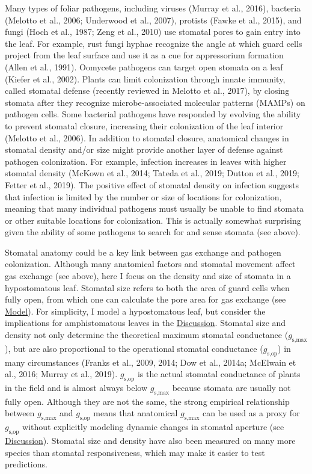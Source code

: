 \documentclass[utf8]{frontiersSCNS}
\newcommand{\gsmax}{$g_\text{s,max}$}
\newcommand{\gsop}{$g_\text{s,op}$}
\begin{document}
Many types of foliar pathogens, including viruses (Murray et al., 2016),
bacteria (Melotto et al., 2006; Underwood et al., 2007), protists (Fawke
et al., 2015), and fungi (Hoch et al., 1987; Zeng et al., 2010) use
stomatal pores to gain entry into the leaf. For example, rust fungi
hyphae recognize the angle at which guard cells project from the leaf
surface and use it as a cue for appressorium formation (Allen et al.,
1991). Oomycete pathogens can target open stomata on a leaf (Kiefer et
al., 2002). Plants can limit colonization through innate immunity,
called stomatal defense (recently reviewed in Melotto et al., 2017), by
closing stomata after they recognize microbe-associated molecular
patterns (MAMPs) on pathogen cells. Some bacterial pathogens have
responded by evolving the ability to prevent stomatal closure,
increasing their colonization of the leaf interior (Melotto et al.,
2006). In addition to stomatal closure, anatomical changes in stomatal
density and/or size might provide another layer of defense against
pathogen colonization. For example, infection increases in leaves with
higher stomatal density (McKown et al., 2014; Tateda et al., 2019;
Dutton et al., 2019; Fetter et al., 2019). The positive effect of
stomatal density on infection suggests that infection is limited by the
number or size of locations for colonization, meaning that many
individual pathogens must usually be unable to find stomata or other
suitable locations for colonization. This is actually somewhat
surprising given the ability of some pathogens to search for and sense
stomata (see above).

Stomatal anatomy could be a key link between gas exchange and pathogen
colonization. Although many anatomical factors and stomatal movement
affect gas exchange (see above), here I focus on the density and size of
stomata in a hypostomatous leaf. Stomatal size refers to both the area
of guard cells when fully open, from which one can calculate the pore
area for gas exchange (see \protect\hyperlink{model}{Model}). For
simplicity, I model a hypostomatous leaf, but consider the implications
for amphistomatous leaves in the
\protect\hyperlink{discussion}{Discussion}. Stomatal size and density
not only determine the theoretical maximum stomatal conductance
(\gsmax), but are also proportional to the operational stomatal
conductance (\gsop) in many circumstances (Franks et al., 2009, 2014;
Dow et al., 2014a; McElwain et al., 2016; Murray et al., 2019). \gsop{}
is the actual stomatal conductance of plants in the field and is almost
always below \gsmax{} because stomata are usually not fully open.
Although they are not the same, the strong empirical relationship
between \gsmax{} and \gsop{} means that anatomical \gsmax{} can be used
as a proxy for \gsop{} without explicitly modeling dynamic changes in
stomatal aperture (see \protect\hyperlink{discussion}{Discussion}).
Stomatal size and density have also been measured on many more species
than stomatal responsiveness, which may make it easier to test
predictions.
\end{document}
